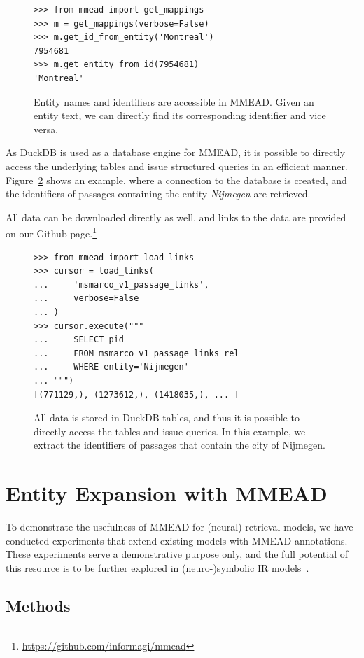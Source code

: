 \begin{figure}
	\begin{verbatim}
>>> from mmead import get_mappings
>>> m = get_mappings(verbose=False)
>>> m.get_id_from_entity('Montreal')
7954681
>>> m.get_entity_from_id(7954681)
'Montreal'
	\end{verbatim}
	\caption{Entity names and identifiers are accessible in MMEAD. Given an entity text, we can directly find its corresponding identifier and vice versa.}
	\label{fig:load_mappings}
\end{figure}

As DuckDB is used as a database engine for MMEAD, it is possible to directly access the underlying tables and issue structured queries in an efficient manner. Figure~\ref{fig:sql_engine} shows an example, where a connection to the database is created, and the identifiers of passages containing the entity \emph{Nijmegen} are retrieved.

All data can be downloaded directly as well, and links to the data are provided on our Github page.\footnote{\url{https://github.com/informagi/mmead}}

\begin{figure}
	\begin{verbatim}
>>> from mmead import load_links
>>> cursor = load_links(
...     'msmarco_v1_passage_links',
...     verbose=False
... )
>>> cursor.execute("""
...     SELECT pid 
...     FROM msmarco_v1_passage_links_rel 
...     WHERE entity='Nijmegen'
... """)
[(771129,), (1273612,), (1418035,), ... ]
	\end{verbatim}
	\caption{All data is stored in DuckDB tables, and thus it is possible to directly access the tables and issue queries. In this example, we extract the identifiers of passages that contain the city of Nijmegen.}
	\label{fig:sql_engine}
\end{figure}

\section{Entity Expansion with MMEAD}
To demonstrate the usefulness of MMEAD for (neural) retrieval models, we have conducted experiments that extend existing models with MMEAD annotations.
These experiments serve a demonstrative purpose only, and the full potential of this resource is to be further explored in (neuro-)symbolic IR models~\citep{Gerritse:2022:EMBERT,Tran:2022:DRE}.

\subsection{Methods}

